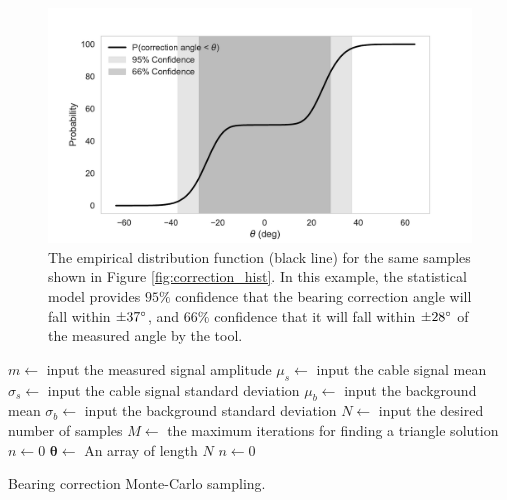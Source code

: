\documentclass[paper=a4, fontsize=11pt]{scrartcl}
\numberwithin{equation}{section}		%
\numberwithin{figure}{section}			%
\numberwithin{table}{section}				%
\begin{document}
\begin{appendices}
\begin{figure}[H]
  \caption{
  The empirical distribution function (black line) for the same samples shown in Figure \ref{fig:correction_hist}.  In this example, the statistical model provides  $95\%$ confidence that the bearing correction angle will fall within $\pm 37\degree$, and  $66\%$ confidence that it will fall within $\pm 28\degree$ of the measured angle by the tool.
  }
  \label{fig:correction_ecdf}
  \centering
  \includegraphics[width=1.0\textwidth]{figures/correction_ecdf.pdf}
\end{figure}


\pagebreak
\begin{algorithm}[H] \label{monte_algo}
\SetAlgoLined
{}
 $m \gets$ input the measured signal amplitude\;
 $\mu_s \gets$ input the cable signal mean\;
 $\sigma_s \gets$ input the cable signal standard deviation\;
 $\mu_b \gets$ input the background mean\;
 $\sigma_b \gets$ input the background standard deviation\;
 $N \gets$ input the desired number of samples\;
 $M \gets$ the maximum iterations for finding a triangle solution\;
 $n \gets 0$\;
 $\bm{\theta} \gets$ An array of length $N$\;
 $n \gets 0$\;
 \caption{Bearing correction Monte-Carlo sampling.}
\end{algorithm}

\end{appendices}


\end{document}
